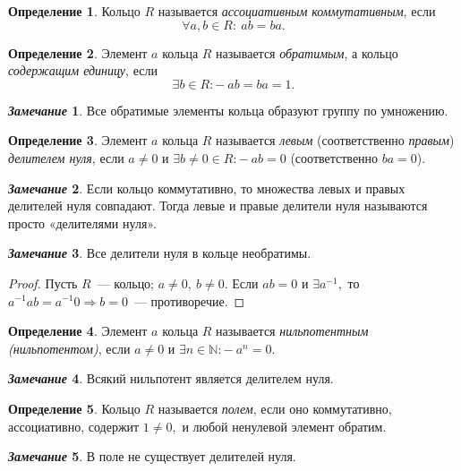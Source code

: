 \documentclass[a4paper, 14pt]{extarticle}
\newcommand{\naturals}{\mathbb{N}}
\newcommand{\suchthat}{{:}{-} \ }
\theoremstyle{definition}
\newtheorem*{remark}{\textit{Замечание}}
\newtheorem{definition}{Определение}
\theoremstyle{plain}
\numberwithin{theorem}{section}
\numberwithin{definition}{section}
\numberwithin{statement}{section}
\numberwithin{lemma}{section}
\numberwithin{consequence}{section}
\begin{document}
		\begin{definition}
			Кольцо $R$ называется \textit{ассоциативным} \textit{коммутативным}, если 
			\begin{equation*}
				\forall a, b \in R{:} \ ab = ba.
			\end{equation*}
		\end{definition}
		\begin{definition}
			Элемент $a$ кольца $R$ называется \textit{обратимым}, а кольцо \textit{содержащим единицу}, если 
			\begin{equation*}
				\exists b \in R \suchthat ab = ba = 1.
			\end{equation*}
		\end{definition}
		\begin{remark}
			Все обратимые элементы кольца образуют группу по умножению.
		\end{remark}
		\begin{definition}
			Элемент $a$ кольца $R$ называется \textit{левым} (соответственно \textit{правым}) \textit{делителем нуля}, если ${a \neq 0}$ и ${\exists b \neq 0 \in R \suchthat ab = 0}$ (соответственно $ba = 0$).
		\end{definition}
		\begin{remark}
			Если кольцо коммутативно, то множества левых и правых делителей нуля совпадают. Тогда левые и правые делители нуля называются просто «делителями нуля».
		\end{remark}
		\begin{remark}
			Все делители нуля в кольце необратимы.
		\end{remark}
		\begin{proof}
			Пусть $R$~--- кольцо; ${a \neq 0, \ b \neq 0.}$ Если ${ab = 0}$ и ${\exists a^{-1},}$ то ${a^{-1}ab = a^{-1}0 \Longrightarrow b = 0}$~--- противоречие.
		\end{proof}
		\begin{definition}
			Элемент $a$ кольца $R$ называется \textit{нильпотентным (нильпотентом)}, если ${a \neq 0}$ и ${\exists n \in \naturals \suchthat a^n = 0.}$
		\end{definition}
		\begin{remark}
			Всякий нильпотент является делителем нуля.
		\end{remark}
		\begin{definition}
			Кольцо $R$ называется \textit{полем}, если оно коммутативно, ассоциативно, содержит ${1 \neq 0,}$ и любой ненулевой элемент обратим.
		\end{definition}
		\begin{remark}
			В поле не существует делителей нуля.
		\end{remark}
\end{document}
